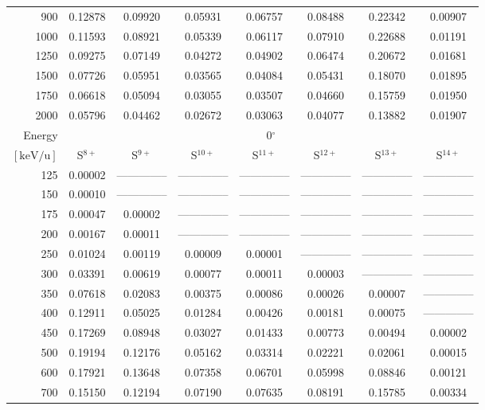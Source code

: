 \begin{table}[ht]
\begin{tabular}{r|c|c|c|c|c|c|c}
      900 & 0.12878 & 0.09920 & 0.05931 & 0.06757 & 0.08488 & 0.22342 & 0.00907 \\
     1000 & 0.11593 & 0.08921 & 0.05339 & 0.06117 & 0.07910 & 0.22688 & 0.01191 \\
     1250 & 0.09275 & 0.07149 & 0.04272 & 0.04902 & 0.06474 & 0.20672 & 0.01681 \\
     1500 & 0.07726 & 0.05951 & 0.03565 & 0.04084 & 0.05431 & 0.18070 & 0.01895 \\
     1750 & 0.06618 & 0.05094 & 0.03055 & 0.03507 & 0.04660 & 0.15759 & 0.01950 \\
     2000 & 0.05796 & 0.04462 & 0.02672 & 0.03063 & 0.04077 & 0.13882 & 0.01907 \\ \cline{1-8}
    Energy & \multicolumn{7}{c}{0$^\circ$} \\ \cline{2-8}
    $\mathrm{[keV/u]}$ & S$^{8+}$ & S$^{9+}$ & S$^{10+}$ & S$^{11+}$ & S$^{12+}$ & S$^{13+}$ & S$^{14+}$ \\ \cline{1-8}
      125 & 0.00002 & -------------- & -------------- & -------------- & -------------- & -------------- & -------------- \\
      150 & 0.00010 & -------------- & -------------- & -------------- & -------------- & -------------- & -------------- \\
      175 & 0.00047 & 0.00002 & -------------- & -------------- & -------------- & -------------- & -------------- \\
      200 & 0.00167 & 0.00011 & -------------- & -------------- & -------------- & -------------- & -------------- \\
      250 & 0.01024 & 0.00119 & 0.00009 & 0.00001 & -------------- & -------------- & -------------- \\
      300 & 0.03391 & 0.00619 & 0.00077 & 0.00011 & 0.00003 & -------------- & -------------- \\
      350 & 0.07618 & 0.02083 & 0.00375 & 0.00086 & 0.00026 & 0.00007 & -------------- \\
      400 & 0.12911 & 0.05025 & 0.01284 & 0.00426 & 0.00181 & 0.00075 & -------------- \\
      450 & 0.17269 & 0.08948 & 0.03027 & 0.01433 & 0.00773 & 0.00494 & 0.00002 \\
      500 & 0.19194 & 0.12176 & 0.05162 & 0.03314 & 0.02221 & 0.02061 & 0.00015 \\
      600 & 0.17921 & 0.13648 & 0.07358 & 0.06701 & 0.05998 & 0.08846 & 0.00121 \\
      700 & 0.15150 & 0.12194 & 0.07190 & 0.07635 & 0.08191 & 0.15785 & 0.00334 \\

\end{tabular}
\end{table}
